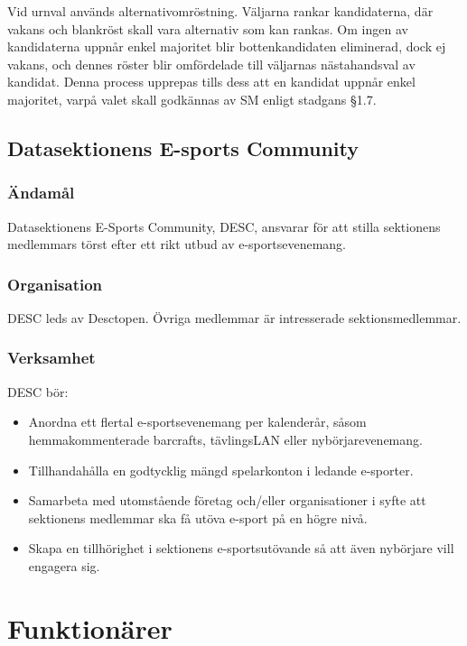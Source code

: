 \documentclass{dgovdoc}
\begin{document}
Vid urnval används alternativomröstning. Väljarna rankar kandidaterna, där
vakans och blankröst skall vara alternativ som kan rankas. Om ingen av
kandidaterna uppnår enkel majoritet blir bottenkandidaten eliminerad, dock
ej vakans, och dennes röster blir omfördelade till väljarnas nästahandsval av
kandidat. Denna process upprepas tills dess att en kandidat uppnår enkel
majoritet, varpå valet skall godkännas av SM enligt stadgans §1.7.

\subsection{Datasektionens E-sports Community}

\subsubsection{Ändamål}

Datasektionens E-Sports Community, DESC, ansvarar för att stilla sektionens
medlemmars törst efter ett rikt utbud av e-sportsevenemang.

\subsubsection{Organisation}

DESC leds av Desctopen. Övriga medlemmar är intresserade
sektionsmedlemmar.

\subsubsection{Verksamhet}

DESC bör:

\begin{itemize}
\item Anordna ett flertal e-sportsevenemang per kalenderår, såsom hemmakommenterade
barcrafts, tävlingsLAN eller nybörjarevenemang.
\item Tillhandahålla en godtycklig mängd spelarkonton i ledande e-sporter.
\item Samarbeta med utomstående företag och/eller organisationer i syfte att sektionens
medlemmar ska få utöva e-sport på en högre nivå.
\item Skapa en tillhörighet i sektionens e-sportsutövande så att även nybörjare vill engagera
sig.
\end{itemize}

\section{Funktionärer}
\end{document}
